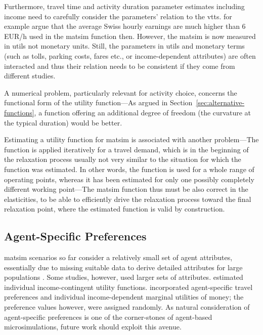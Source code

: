 Furthermore, travel time and activity duration parameter estimates including income need to carefully consider the parameters' relation to the \gls{vtts}. \citet[][p.276]{MeisterEtAl_SVT_2009} for example argue that the average Swiss hourly earnings are much higher than 6\,EUR/h used in the \gls{matsim} function then. However, the \gls{matsim} is now measured in utils not monetary units. Still, the parameters in utils and monetary terms (such as tolls, parking costs, fares etc., or income-dependent attributes) are often interacted and thus their relation needs to be consistent if they come from different studies.
%

A numerical problem, particularly relevant for activity choice, concerns the functional form of the utility function---As argued in Section~\ref{sec:alternative-functions}, a function offering an additional degree of freedom (the curvature at the typical duration) would be better.

Estimating a utility function for \gls{matsim} is associated with another problem---The function is applied iteratively for a travel demand, which is in the beginning of the relaxation process usually not very similar to the situation for which the function was estimated. In other words, the function is used for a whole range of operating points, whereas it has been estimated for only one possibly completely different working point---The \gls{matsim} function thus must be also correct in the elasticities, to be able to efficiently drive the relaxation process toward the final relaxation point, where the estimated function is valid by construction. 

\subsection{Agent-Specific Preferences}
\label{sec:agent-specific-prefs}
\gls{matsim} scenarios so far consider a relatively small set of agent attributes, essentially due to missing suitable data to derive detailed attributes for large populations \citep[][]{MuellerFloetteroed_unpub_hEART_2014}. Some studies, however, used larger sets of attributes. \citet{GretherEtAl2010TrbIncomeInTRR, KickhoeferEtAl2011PolicyEvaluationIncome} estimated individual income-contingent utility functions. \citet[][]{HorniEtAl_TechRep_IVT_2012_a, HorniAxhausen_TechRep_IVT_2014} incorporated agent-specific travel preferences and individual income-dependent marginal utilities of money; the preference values however, were assigned randomly. As natural consideration of agent-specific preferences is one of the corner-stones of agent-based \glspl{microsimulation}, future work should exploit this avenue. 


